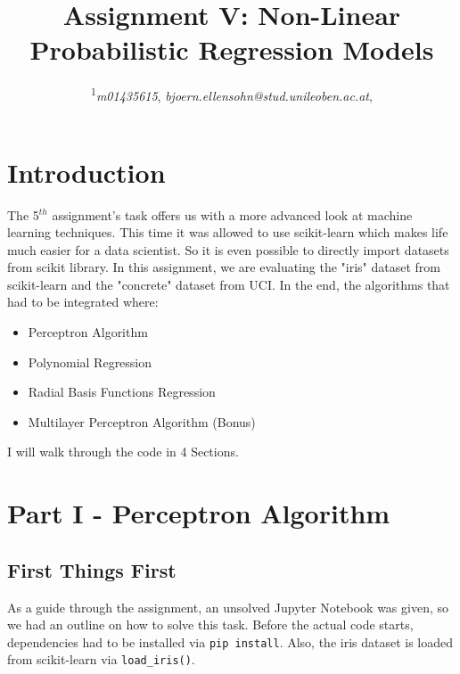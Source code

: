 \documentclass{CPSReport}
\title{Assignment V: Non-Linear Probabilistic Regression Models} %
\author{
	\coursetitle{Introduction to Machine Learning Lab (190.013), SS2023}
	\authorstyle{Björn Ellensohn\textsuperscript{1}} %
	\newline\newline %
	\textsuperscript{1}\textit{m01435615}, \textit{bjoern.ellensohn@stud.unileoben.ac.at}, \institution{Montanuniversität Leoben, Austria}\\ %
	\submissiondate{\today} %
}
\begin{document}
\maketitle %

\thispagestyle{firstpage} %



\section{Introduction}
The 5$^{th}$ assignment's task offers us with a more advanced look at machine learning techniques. This time it was allowed to use scikit-learn which makes life much easier for a data scientist. So it is even possible to directly import datasets from scikit library. In this assignment, we are evaluating the "iris" dataset from scikit-learn and the "concrete" dataset from UCI.  In the end, the algorithms that had to be integrated where:
\begin{itemize}
    \item Perceptron Algorithm
    \item Polynomial Regression
    \item Radial Basis Functions Regression
    \item Multilayer Perceptron Algorithm (Bonus)
\end{itemize}

I will walk through the code in 4 Sections.

\section{Part I - Perceptron Algorithm}
\subsection{First Things First}
As a guide through the assignment, an unsolved Jupyter Notebook was given, so we had an outline on how to solve this task. Before the actual code starts, dependencies had to be installed via \texttt{pip install}. Also, the iris dataset is loaded from scikit-learn via \texttt{load_iris()}. 
\end{document}
